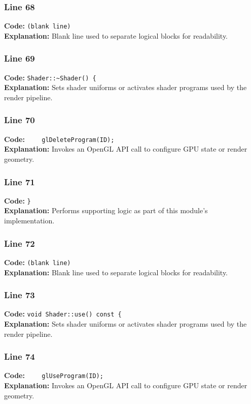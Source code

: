 \documentclass[11pt,a4paper]{article}
\begin{document}
\subsubsection*{Line 68}
\textbf{Code:} \texttt{(blank line)}\\
\textbf{Explanation:} Blank line used to separate logical blocks for readability.

\subsubsection*{Line 69}
\textbf{Code:} \verb|Shader::~Shader() {|\\
\textbf{Explanation:} Sets shader uniforms or activates shader programs used by the render pipeline.

\subsubsection*{Line 70}
\textbf{Code:} \verb|    glDeleteProgram(ID);|\\
\textbf{Explanation:} Invokes an OpenGL API call to configure GPU state or render geometry.

\subsubsection*{Line 71}
\textbf{Code:} \verb|}|\\
\textbf{Explanation:} Performs supporting logic as part of this module's implementation.

\subsubsection*{Line 72}
\textbf{Code:} \texttt{(blank line)}\\
\textbf{Explanation:} Blank line used to separate logical blocks for readability.

\subsubsection*{Line 73}
\textbf{Code:} \verb|void Shader::use() const {|\\
\textbf{Explanation:} Sets shader uniforms or activates shader programs used by the render pipeline.

\subsubsection*{Line 74}
\textbf{Code:} \verb|    glUseProgram(ID);|\\
\textbf{Explanation:} Invokes an OpenGL API call to configure GPU state or render geometry.
\end{document}
